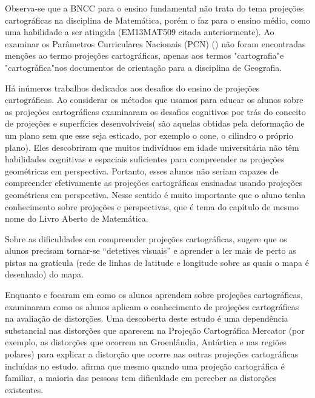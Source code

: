 \begin{apresentacao}
{Observa-se que a BNCC para o ensino fundamental não trata do tema projeções cartográficas na disciplina de Matemática, porém o faz para o ensino médio, como uma habilidade a ser atingida (EM13MAT509 citada anteriormente).  Ao examinar os Parâmetros Curriculares Nacionais (PCN) (\cite{PCN}) não foram encontradas menções ao termo projeções cartográficas, apenas aos termos "cartografia"{}e "cartográfica"{}nos documentos de orientação para a disciplina de Geografia. 

Há inúmeros trabalhos dedicados aos desafios do ensino de projeções cartográficas. Ao considerar os métodos que usamos para educar os alunos sobre as projeções cartográficas \cite{Downs}  examinaram os desafios cognitivos por trás do conceito de projeções e superfícies desenvolvíveis( são aquelas obtidas pela deformação de um plano sem que esse seja esticado, por exemplo o cone, o cilindro o próprio plano). Eles descobriram que muitos indivíduos em idade universitária não têm habilidades cognitivas e espaciais suficientes para compreender as projeções geométricas em perspectiva. Portanto, esses alunos não seriam capazes de compreender efetivamente as projeções cartográficas ensinadas usando projeções geométricas em perspectiva. Nesse sentido é muito importante que o aluno tenha conhecimento sobre projeções e perspectivas, que é tema do capítulo de mesmo nome do Livro Aberto de Matemática.

 Sobre as dificuldades em compreender projeções cartográficas, \cite{Olson} sugere que os alunos  precisam  tornar-se “detetives visuais” e aprender a ler mais de perto as pistas na gratícula (rede de linhas de latitude e longitude sobre as quais o mapa é desenhado) do mapa.

Enquanto \cite{Downs} e \cite{Olson} focaram em como os alunos aprendem sobre projeções cartográficas, \cite{Battersby} examinaram como os alunos aplicam o conhecimento de projeções cartográficas na avaliação de distorções. Uma descoberta deste estudo é uma dependência substancial nas distorções que aparecem na Projeção Cartográfica Mercator (por exemplo, as distorções que ocorrem na Groenlândia, Antártica e nas regiões polares) para explicar a distorção que ocorre nas outras projeções cartográficas incluídas no estudo. \cite{Battersby} afirma que mesmo quando uma projeção cartográfica é familiar, a maioria das pessoas tem dificuldade em perceber as distorções existentes.

}
\end{apresentacao}
